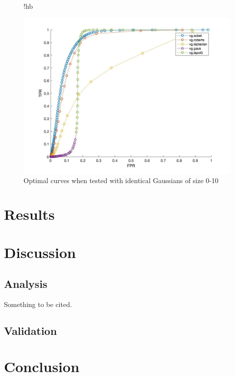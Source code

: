 \documentclass{Resources/UoBLab1}
\begin{document}
\begin{figure}{!hb}
    \begin{center}
		\includegraphics[scale=0.20]{Resources/images/all_1_to_10.jpg}
		\caption{Optimal curves when tested with identical Gaussians of size 0-10}
        \label{fig:1to10}
    \end{center}
\end{figure}



\section{Results}
\lipsum[7]

\section{Discussion}
\subsection{Analysis}
\lipsum[8]
Something to be cited.\cite{reference2}
\lipsum[2]

\subsection{Validation}
\lipsum[9]

\section{Conclusion}
\lipsum[10]
\end{document}
